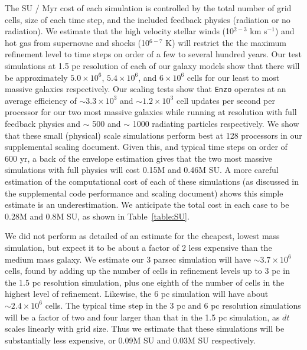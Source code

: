 \documentclass[11pt]{article}
\begin{document}
The SU / Myr cost of each simulation is controlled by the total number of grid cells, size of each time step, and the included feedback physics (radiation or no radiation). We estimate that the high velocity stellar winds (10$^{2-3}$ km s$^{-1}$) and hot gas from supernovae and shocks (10$^{6-7}$ K) will restrict the the maximum refinement level to time steps on order of a few to several hundred years. Our test simulations at 1.5 pc resolution of each of our galaxy models show that there will be approximately $5.0 \times 10^{6}$, $5.4 \times 10^{6}$, and $6 \times 10^{6}$ cells for our least to most massive galaxies respectively. Our scaling tests show that \texttt{Enzo} operates at an average efficiency of $\sim 3.3\times 10^{3}$ and $\sim 1.2\times 10^{3}$ cell updates per second per processor for our two most massive galaxies while running at resolution with full feedback physics and $\sim$ 500 and $\sim$ 1000 radiating particles respectively. We show that these small (physical) scale simulations perform best at 128 processors in our supplemental scaling document. Given this, and typical time steps on order of 600 yr, a back of the envelope estimation gives that the two most massive simulations with full physics will cost 0.15M and 0.46M SU. A more careful estimation of the computational cost of each of these simulations (as discussed in the supplemental code performance and scaling document) shows this simple estimate is an underestimation. We anticipate the total cost in each case to be 0.28M and 0.8M SU, as shown in Table~\ref{table:SU}.

We did not perform as detailed of an estimate for the cheapest, lowest mass simulation, but expect it to be about a factor of 2 less expensive than the medium mass galaxy. We estimate our 3 parsec simulation will have $\sim 3.7 \times 10^{6}$ cells, found by adding up the number of cells in refinement levels up to 3 pc in the 1.5 pc resolution simulation, plus one eighth of the number of cells in the highest level of refinement. Likewise, the 6 pc simulation will have about $\sim 2.4 \times 10^{6}$ cells. The typical time step in the 3 pc and 6 pc resolution simulations will be a factor of two and four larger than that in the 1.5 pc simulation, as $dt$ scales linearly with grid size. Thus we estimate that these simulations will be substantially less expensive, or 0.09M SU and 0.03M SU respectively.
\end{document}
